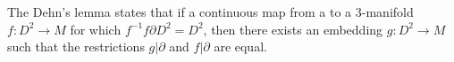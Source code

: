 \documentclass[12pt]{article}
\begin{document}
The Dehn's lemma states that if a continuous map from  a 
 to a 3-manifold
$f\colon D^2\to M$ for which $f^{-1}f\partial D^2=D^2$, then there exists an embedding $g\colon D^2\to M$ such that the restrictions $ g\vert\partial$ and $ f\vert\partial$ are
equal.

\end{document}
